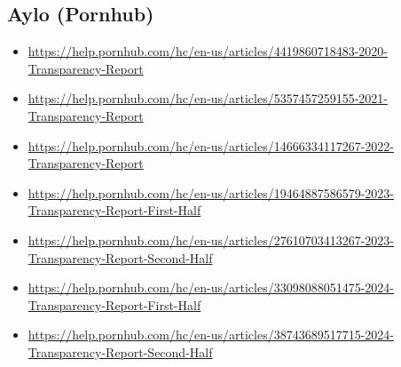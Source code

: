 {%




\subsection*{Aylo (Pornhub)}
{\footnotesize
\begin{itemize}
\item[]\url{https://help.pornhub.com/hc/en-us/articles/4419860718483-2020-Transparency-Report}
\item[]\url{https://help.pornhub.com/hc/en-us/articles/5357457259155-2021-Transparency-Report}
\item[]\url{https://help.pornhub.com/hc/en-us/articles/14666334117267-2022-Transparency-Report}
\item[]\url{https://help.pornhub.com/hc/en-us/articles/19464887586579-2023-Transparency-Report-First-Half}
\item[]\url{https://help.pornhub.com/hc/en-us/articles/27610703413267-2023-Transparency-Report-Second-Half}
\item[]\url{https://help.pornhub.com/hc/en-us/articles/33098088051475-2024-Transparency-Report-First-Half}
\item[]\url{https://help.pornhub.com/hc/en-us/articles/38743689517715-2024-Transparency-Report-Second-Half}
\end{itemize}
}


}

